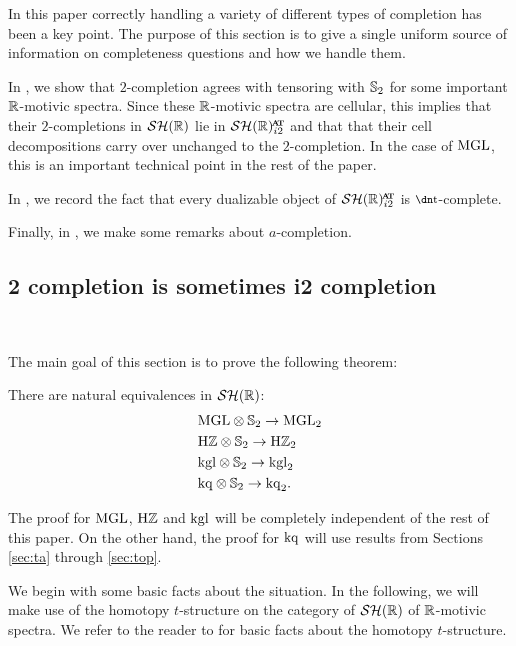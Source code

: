 In this paper correctly handling a variety of different types of completion has been a key point.
The purpose of this section is to give a single uniform source of information on completeness questions and how we handle them.

In , we show that $2$-completion agrees with tensoring with $\operatorname{\mathbb{S}}_2$ for some important $\mathbb{R}$-motivic spectra. Since these $\mathbb{R}$-motivic spectra are cellular, this implies that their $2$-completions in $\mathcal{SH}(\mathbb{R})$ lie in $\SHRat$ and that that their cell decompositions carry over unchanged to the $2$-completion.
In the case of $\mathrm{MGL}$, this is an important technical point in the rest of the paper.

In , we record the fact that every dualizable object of $\SHRat$ is $\ta$-complete.

Finally, in , we make some remarks about $a$-completion.

\subsection{2 completion is sometimes i2 completion}\label{sec:2vsi2complete} \

The main goal of this section is to prove the following theorem:

\begin{thm}\label{thm:complete-compare}
  There are natural equivalences in $\mathcal{SH}(\mathbb{R})$:
  \begin{align*}
    &\mathrm{MGL} \otimes \operatorname{\mathbb{S}}_2 \to \mathrm{MGL}_2 \\
    &\mathrm{H}\mathbb{Z} \otimes \operatorname{\mathbb{S}}_2 \to \mathrm{H}\mathbb{Z}_2 \\
    &\mathrm{kgl} \otimes \operatorname{\mathbb{S}}_2 \to \mathrm{kgl}_2 \\
    &\mathrm{kq} \otimes \operatorname{\mathbb{S}}_2 \to \mathrm{kq}_2.
  \end{align*}
\end{thm}

The proof for $\mathrm{MGL}$, $\mathrm{H}\mathbb{Z}$ and $\mathrm{kgl}$ will be completely independent of the rest of this paper. On the other hand, the proof for $\mathrm{kq}$ will use results from Sections \ref{sec:ta} through \ref{sec:top}.

We begin with some basic facts about the situation.
In the following, we will make use of the homotopy $t$-structure on the category of $\mathcal{SH}(\mathbb{R})$ of $\mathbb{R}$-motivic spectra.
We refer to the reader to \cite[\S 2.1]{HM} for basic facts about the homotopy $t$-structure.

